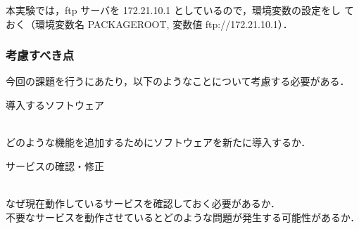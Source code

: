 本実験では，ftp サーバを 172.21.10.1 としているので，環境変数の設定をし
ておく（環境変数名 PACKAGEROOT, 変数値 ftp://172.21.10.1）．

\subsubsection*{考慮すべき点}
今回の課題を行うにあたり，以下のようなことについて考慮する必要がある．
\begin{itemize}
{\bf \item{導入するソフトウェア}}\\
どのような機能を追加するためにソフトウェアを新たに導入するか．\\

{\bf \item{サービスの確認・修正}}\\
なぜ現在動作しているサービスを確認しておく必要があるか．\\
不要なサービスを動作させているとどのような問題が発生する可能性があるか．
\end{itemize}
